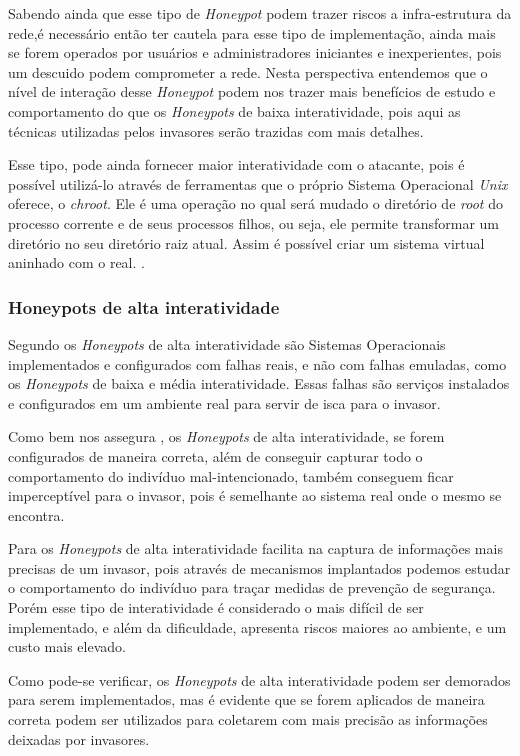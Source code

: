 Sabendo ainda que esse tipo de \textit{Honeypot} podem trazer riscos a infra-estrutura da rede,é necessário então ter cautela para esse tipo de implementação, ainda mais se forem operados por usuários e administradores iniciantes e inexperientes, pois um descuido podem comprometer a rede. Nesta perspectiva entendemos que o nível de interação desse \textit{Honeypot} podem nos trazer mais benefícios de estudo e comportamento do que os \textit{Honeypots} de baixa interatividade, pois aqui as técnicas utilizadas pelos invasores serão trazidas com mais detalhes.

Esse tipo, pode ainda fornecer maior interatividade com o atacante, pois é possível utilizá-lo através de ferramentas que o próprio Sistema Operacional \textit{Unix} oferece, o \textit{chroot}. Ele é uma operação no qual será mudado o diretório de \textit{root} do processo corrente e de seus processos filhos, ou seja, ele permite transformar um diretório no seu diretório raiz atual. Assim é possível criar um sistema virtual aninhado com o real. \cite{batistela2009}.

\subsubsection{Honeypots de alta interatividade}
Segundo  os \textit{Honeypots} de alta interatividade são Sistemas Operacionais implementados e configurados com falhas reais, e não com falhas emuladas, como os \textit{Honeypots} de baixa e média interatividade. Essas falhas são serviços instalados e configurados em um ambiente real para servir de isca para o invasor.

Como bem nos assegura , os \textit{Honeypots} de alta interatividade, se forem configurados de maneira correta, além de conseguir capturar todo o comportamento do indivíduo mal-intencionado, também conseguem ficar imperceptível para o invasor, pois é semelhante ao sistema real onde o mesmo se encontra.

Para  os \textit{Honeypots} de alta interatividade facilita na captura de informações mais precisas de um invasor, pois através de mecanismos implantados podemos estudar o comportamento do indivíduo para traçar medidas de prevenção de segurança. Porém esse tipo de interatividade é considerado o mais difícil de ser implementado, e além da dificuldade, apresenta riscos maiores ao ambiente, e um custo mais elevado.

Como pode-se verificar, os \textit{Honeypots} de alta interatividade podem ser demorados para serem implementados, mas é evidente que se forem aplicados de maneira correta podem ser utilizados para coletarem com mais precisão as informações deixadas por invasores.

